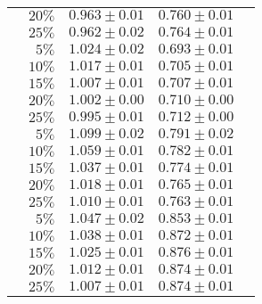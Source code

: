 \begin{table}[bt]
\begin{tabular}{lrccc}
                        & $20\%$ &  $0.963 \pm 0.01$  &  $0.760 \pm 0.01$  \\
                        & $25\%$ &  $0.962 \pm 0.02$  &  $0.764 \pm 0.01$  \\
\midrule
\multirow{5}{*}{\sla{}} & $5\%$  &  $1.024 \pm 0.02$  &  $0.693 \pm 0.01$  \\
                        & $10\%$ &  $1.017 \pm 0.01$  &  $0.705 \pm 0.01$  \\
                        & $15\%$ &  $1.007 \pm 0.01$  &  $0.707 \pm 0.01$  \\
                        & $20\%$ &  $1.002 \pm 0.00$  &  $0.710 \pm 0.00$  \\
                        & $25\%$ &  $0.995 \pm 0.01$  &  $0.712 \pm 0.00$  \\
\midrule
\multirow{5}{*}{\epi{}} & $5\%$  &  $1.099 \pm 0.02$  &  $0.791 \pm 0.02$  \\
                        & $10\%$ &  $1.059 \pm 0.01$  &  $0.782 \pm 0.01$  \\
                        & $15\%$ &  $1.037 \pm 0.01$  &  $0.774 \pm 0.01$  \\
                        & $20\%$ &  $1.018 \pm 0.01$  &  $0.765 \pm 0.01$  \\
                        & $25\%$ &  $1.010 \pm 0.01$  &  $0.763 \pm 0.01$  \\
\midrule
\multirow{5}{*}{\kiw{}} & $5\%$  &  $1.047 \pm 0.02$  &  $0.853 \pm 0.01$  \\
                        & $10\%$ &  $1.038 \pm 0.01$  &  $0.872 \pm 0.01$  \\
                        & $15\%$ &  $1.025 \pm 0.01$  &  $0.876 \pm 0.01$  \\
                        & $20\%$ &  $1.012 \pm 0.01$  &  $0.874 \pm 0.01$  \\
                        & $25\%$ &  $1.007 \pm 0.01$  &  $0.874 \pm 0.01$  \\
\bottomrule
  \end{tabular}
\end{table}

